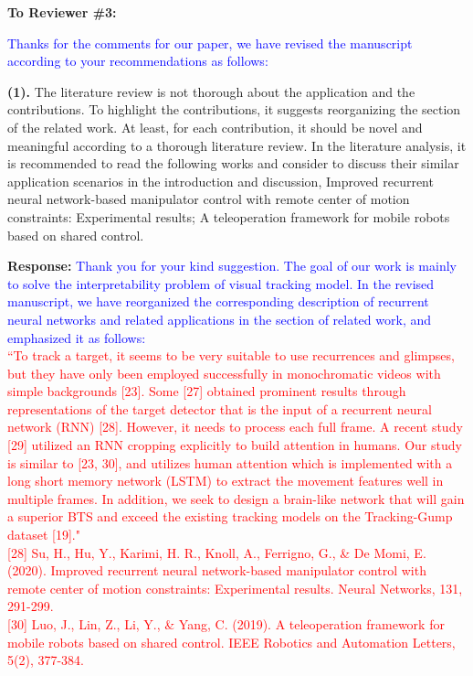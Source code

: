 \documentclass[12pt,journal,onecolumn]{IEEEtran}
\begin{document}
\vspace{8pt}

\newpage





\textbf{To Reviewer \#3:}

\textcolor{blue}{Thanks for the comments for our paper, we have revised the manuscript according to your recommendations as follows:}

\textbf{(1).}  The literature review is not thorough about the application and the contributions. 
To highlight the contributions, it suggests reorganizing the section of the related work. 
At least, for each contribution, it should be novel and meaningful according to a thorough literature review. 
In the literature analysis, it is recommended to read the following works and consider to discuss their similar application scenarios in the introduction and discussion, 
Improved recurrent neural network-based manipulator control with remote center of motion constraints: Experimental results; 
A teleoperation framework for mobile robots based on shared control.

\textbf{Response:}  \textcolor{blue}{Thank you for your kind suggestion.
The goal of our work is mainly to solve the interpretability problem of visual tracking model.
In the revised manuscript, we have reorganized the corresponding description of recurrent neural networks and related applications in the section of related work, and emphasized it as follows:} \\
\textcolor{red}{
``To track a target, it seems to be very suitable to use recurrences and glimpses, but they have only been employed successfully in monochromatic videos with simple backgrounds [23]. 
Some [27] obtained prominent results through representations of the target detector that is the input of a recurrent neural network (RNN) [28].
However, it needs to process each full frame. 
A recent study [29] utilized an RNN cropping explicitly to build attention in humans. 
Our study is similar to [23, 30], and utilizes human attention which is implemented with a long short memory network (LSTM) to extract the movement features well in multiple frames. 
In addition, we seek to design a brain-like network that will gain a superior BTS and exceed the existing tracking models on the Tracking-Gump dataset [19]."
} \\
\textcolor{red}{
[28] Su, H., Hu, Y., Karimi, H. R., Knoll, A., Ferrigno, G., \& De Momi, E. (2020). Improved recurrent neural network-based manipulator control with remote center of motion constraints: Experimental results. Neural Networks, 131, 291-299.
} \\
\textcolor{red}{[30] 
Luo, J., Lin, Z., Li, Y., \& Yang, C. (2019). A teleoperation framework for mobile robots based on shared control. IEEE Robotics and Automation Letters, 5(2), 377-384.
} \\
\vspace{8pt} 
\end{document}
